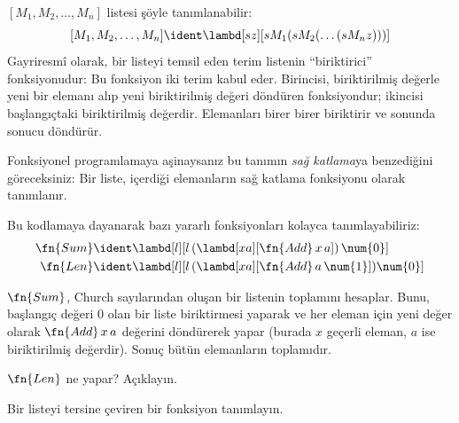 \documentclass[../../../include/open-logic-section]{subfiles}
\begin{document}

$[M_1, M_2, \ldots, M_n]$ listesi şöyle tanımlanabilir:
\[
  [M_1, M_2, \ldots, M_n] \ident \lambd[sz][s M_1 (s M_2 (\ldots (s M_n z)))]
\]
Gayriresmî olarak, bir listeyi temsil eden terim listenin ``biriktirici''
fonksiyonudur: Bu fonksiyon iki terim kabul eder. Birincisi, biriktirilmiş
değerle yeni bir elemanı alıp yeni biriktirilmiş değeri döndüren fonksiyondur;
ikincisi başlangıçtaki biriktirilmiş değerdir. Elemanları birer birer
biriktirir ve sonunda sonucu döndürür.

\begin{digress}
  Fonksiyonel programlamaya aşinaysanız bu tanımın \emph{sağ katlama}ya
  benzediğini göreceksiniz: Bir liste, içerdiği elemanların sağ katlama
  fonksiyonu olarak tanımlanır.
\end{digress}

Bu kodlamaya dayanarak bazı yararlı fonksiyonları kolayca tanımlayabiliriz:
\begin{align*}
  \fn{Sum} & \ident
  \lambd[l][l \, (\lambd[xa][\fn{Add} \, x \, a])\,  \num{0}]\\
  \fn{Len} & \ident
  \lambd[l][l \, (\lambd[xa][\fn{Add} \, a \, \num{1}]) \num{0}]
\end{align*}

$\fn{Sum}$, Church sayılarından oluşan bir listenin toplamını hesaplar.
Bunu, başlangıç değeri $\num{0}$ olan bir liste biriktirmesi yaparak ve her
eleman için yeni değer olarak $\fn{Add} \, x\, a$ değerini döndürerek yapar
(burada $x$ geçerli eleman, $a$ ise biriktirilmiş değerdir). Sonuç bütün
elemanların toplamıdır.

\begin{prob}
  $\fn{Len}$ ne yapar? Açıklayın.
\end{prob}

\begin{prob}
  Bir listeyi tersine çeviren bir fonksiyon tanımlayın.
\end{prob}
\end{document}
